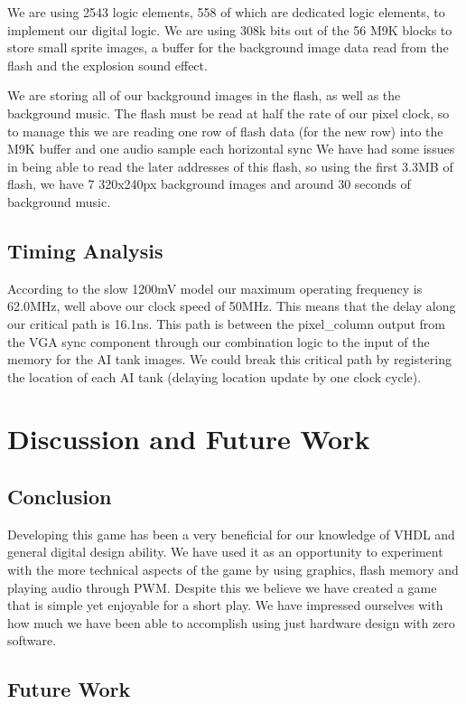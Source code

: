 \documentclass{article}
\begin{document}
We are using 2543 logic elements, 558 of which are dedicated logic elements, to implement our digital logic. We are using 308k bits out of the 56 M9K blocks to store small sprite images, a buffer for the background image data read from the flash and the explosion sound effect.

We are storing all of our background images in the flash, as well as the background music. The flash must be read at half the rate of our pixel clock, so to manage this we are reading one row of flash data (for the new row) into the M9K buffer and one audio sample each horizontal sync  We have had some issues in being able to read the later addresses of this flash, so using the first 3.3MB of flash, we have 7 320x240px background images and around 30 seconds of background music.

\subsection{Timing Analysis}

According to the slow 1200mV model our maximum operating frequency is 62.0MHz, well above our clock speed of 50MHz. This means that the delay along our critical path is 16.1ns. This path is between the pixel_column output from the VGA sync component through our combination logic to the input of the memory for the AI tank images. We could break this critical path by registering the location of each AI tank (delaying location update by one clock cycle).

\section{Discussion and Future Work}

\subsection{Conclusion}

Developing this game has been a very beneficial for our knowledge of VHDL and general digital design ability. We have used it as an opportunity to experiment with the more technical aspects of the game by using graphics, flash memory and playing audio through PWM. Despite this we believe we have created a game that is simple yet enjoyable for a short play. We have impressed ourselves with how much we have been able to accomplish using just hardware design with zero software.

\subsection{Future Work}
\end{document}
